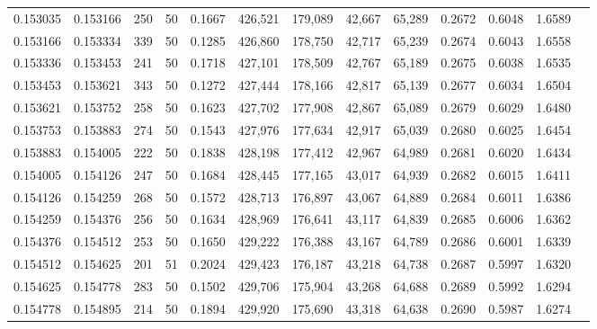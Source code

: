 \begin{tabular}{rrrrrrrrrrrrr}
0.153035 & 0.153166 &   250 &  50 &                                     0.1667 & 426,521 & 179,089 &  42,667 &  65,289 & 0.2672 & 0.6048 & 1.6589 \\
0.153166 & 0.153334 &   339 &  50 &                                     0.1285 & 426,860 & 178,750 &  42,717 &  65,239 & 0.2674 & 0.6043 & 1.6558 \\
0.153336 & 0.153453 &   241 &  50 &                                     0.1718 & 427,101 & 178,509 &  42,767 &  65,189 & 0.2675 & 0.6038 & 1.6535 \\
0.153453 & 0.153621 &   343 &  50 &                                     0.1272 & 427,444 & 178,166 &  42,817 &  65,139 & 0.2677 & 0.6034 & 1.6504 \\
0.153621 & 0.153752 &   258 &  50 &                                     0.1623 & 427,702 & 177,908 &  42,867 &  65,089 & 0.2679 & 0.6029 & 1.6480 \\
0.153753 & 0.153883 &   274 &  50 &                                     0.1543 & 427,976 & 177,634 &  42,917 &  65,039 & 0.2680 & 0.6025 & 1.6454 \\
0.153883 & 0.154005 &   222 &  50 &                                     0.1838 & 428,198 & 177,412 &  42,967 &  64,989 & 0.2681 & 0.6020 & 1.6434 \\
0.154005 & 0.154126 &   247 &  50 &                                     0.1684 & 428,445 & 177,165 &  43,017 &  64,939 & 0.2682 & 0.6015 & 1.6411 \\
0.154126 & 0.154259 &   268 &  50 &                                     0.1572 & 428,713 & 176,897 &  43,067 &  64,889 & 0.2684 & 0.6011 & 1.6386 \\
0.154259 & 0.154376 &   256 &  50 &                                     0.1634 & 428,969 & 176,641 &  43,117 &  64,839 & 0.2685 & 0.6006 & 1.6362 \\
0.154376 & 0.154512 &   253 &  50 &                                     0.1650 & 429,222 & 176,388 &  43,167 &  64,789 & 0.2686 & 0.6001 & 1.6339 \\
0.154512 & 0.154625 &   201 &  51 &                                     0.2024 & 429,423 & 176,187 &  43,218 &  64,738 & 0.2687 & 0.5997 & 1.6320 \\
0.154625 & 0.154778 &   283 &  50 &                                     0.1502 & 429,706 & 175,904 &  43,268 &  64,688 & 0.2689 & 0.5992 & 1.6294 \\
0.154778 & 0.154895 &   214 &  50 &                                     0.1894 & 429,920 & 175,690 &  43,318 &  64,638 & 0.2690 & 0.5987 & 1.6274 \\

\end{tabular}
